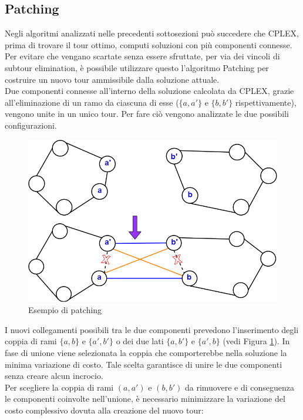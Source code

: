 \subsection{Patching}
Negli algoritmi analizzati nelle precedenti sottosezioni può succedere che CPLEX, prima di trovare il tour ottimo, computi soluzioni con più componenti connesse. Per evitare che vengano scartate senza essere sfruttate, per via dei vincoli di subtour elimination, è possibile utilizzare questo l'algoritmo Patching per costruire un nuovo tour ammissibile dalla soluzione attuale.\\
Due componenti connesse all'interno della soluzione calcolata da CPLEX, grazie all'eliminazione di un ramo da ciascuna di esse ($\{a, a'\}$ e  $\{b, b'\}$ rispettivamente), vengono unite in un unico tour. Per fare ciò vengono analizzate le due possibili configurazioni.\\
\begin{figure}[H] 
\begin{center} 
  \includegraphics[scale=0.3]{Images/patching}
  \caption{\footnotesize{Esempio di patching}} \label{patching} 
\end{center} 
\end{figure}
I nuovi collegamenti possibili tra le due componenti prevedono l'inserimento degli coppia di rami $\{a, b\}$ e $\{a', b'\}$ o dei due lati $\{a, b'\}$ e $\{a', b\}$ (vedi Figura \ref{patching}). In fase di unione viene selezionata la coppia che comporterebbe nella soluzione la minima variazione di costo. Tale scelta garantisce di unire le due componenti senza creare alcun incrocio.\\
Per scegliere la coppia di rami $(a, a')$ e $(b, b')$ da rimuovere e di conseguenza le componenti coinvolte nell'unione, è necessario minimizzare la variazione del costo complessivo dovuta alla creazione del nuovo tour: 
